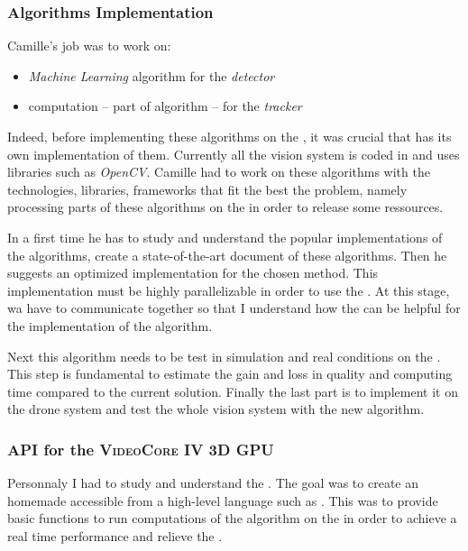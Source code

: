 \subsubsection{Algorithms Implementation}

Camille's job was to work on:

\begin{itemize}
	\item \emph{Machine Learning} algorithm for the \emph{detector}
	\item \flow{} computation -- part of  algorithm -- for the \emph{tracker}
\end{itemize}

Indeed, before implementing these algorithms on the \vc, it was crucial that \groupname{} has its own implementation of them. Currently all the vision system is coded in  and uses libraries such as \emph{OpenCV}. Camille had to work on these algorithms with the technologies, libraries, frameworks that fit the best the problem, namely processing parts of these algorithms on the \vc{} in order to release some  ressources.

In a first time he has to study and understand the popular implementations of the \flow{} algorithms, create a state-of-the-art document of these algorithms. Then he suggests an optimized implementation for the chosen method. This implementation must be highly parallelizable in order to use the \vc. At this stage, wa have to communicate together so that I understand how the \vc{} can be helpful for the implementation of the \flow{} algorithm.

Next this algorithm needs to be test in simulation and real conditions on the \rasp. This step is fundamental to estimate the gain and loss in quality and computing time compared to the current solution. Finally the last part is to implement it on the drone system and test the whole vision system with the new \flow{} algorithm.


\subsubsection{API for the \textsc{VideoCore IV 3D GPU}}

Personnaly I had to study and understand the \vc{}. The goal was to create an homemade  accessible from a high-level language such as . This  was to provide basic functions to run computations of the \flow{} algorithm on the \vc{} in order to achieve a real time performance and relieve the .

